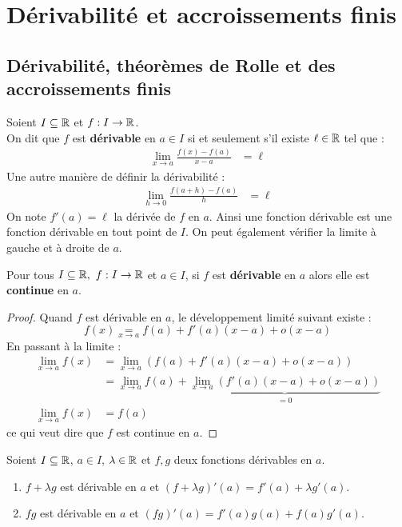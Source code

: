 \chapter{Dérivabilité et accroissements finis}
\def\arraystretch{1}

\section{Dérivabilité, théorèmes de Rolle et des accroissements finis}
\begin{definition}
	Soient $I \subseteq \mathbb{R}$ et $f : I \to \mathbb{R}$.
	\\
	On dit que $f$ est \textbf{dérivable} en $a \in I$ si et seulement s'il existe $\ell \in \mathbb{R}$ tel que :
	\begin{align*}
		  \lim_{x \to a} \frac{f(x) - f(a)}{x - a} &= \ell
	\end{align*}
    Une autre manière de définir la dérivabilité :
    \begin{align*}
        \lim_{h \to 0} \frac{f(a + h) - f(a)}{h} &= \ell
    \end{align*}
	On note $f'(a) = \ell$ la dérivée de $f$ en $a$.
	Ainsi une fonction dérivable est une fonction dérivable en tout point de $I$.
	On peut également vérifier la limite à gauche et à droite de $a$.
\end{definition}

\begin{proposition}
	Pour tous $I \subseteq \mathbb{R},\ f : I \to \mathbb{R}$ et $a \in I$, si $f$ est \textbf{dérivable} en $a$ alors elle est \textbf{continue} en $a$.
\end{proposition}

\begin{proof}
	Quand $f$ est dérivable en $a$, le développement limité suivant existe :
	\[ f(x) \underset{x \to a}{=} f(a) + f'(a)(x - a) + o(x - a) \]
	En passant à la limite :
	\begin{align*}
		\lim_{x \to a} f(x) &= \lim_{x \to a} \left( f(a) + f'(a)(x - a) + o(x - a) \right) \\
		&= \lim_{x \to a} f(a) + \underbrace{\lim_{x \to a} \left( f'(a)(x - a) + o(x - a) \right)}_{= 0} \\
		\lim_{x \to a} f(x) &= f(a)
	\end{align*}
	ce qui veut dire que $f$ est continue en $a$.
\end{proof}

\begin{theorem}
	Soient $I \subseteq \mathbb{R}$, $a \in I$, $\lambda \in \mathbb{R}$ et $f, g$ deux fonctions dérivables en $a$.
	\begin{enumerate}
		\item $f + \lambda g$ est dérivable en $a$ et $(f + \lambda g)'(a) = f'(a) + \lambda g'(a)$.
		\item $f g$ est dérivable en $a$ et $(fg)'(a) = f'(a) g(a) + f(a) g'(a)$.
	\end{enumerate}
\end{theorem}

